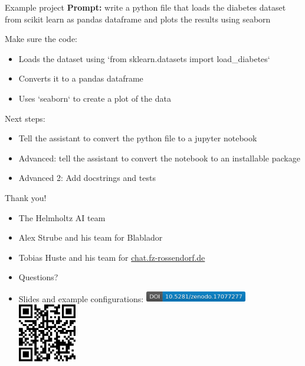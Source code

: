 \documentclass[
  aspectratio=1610,
]{beamer}
\begin{document}
\begin{frame}{Example project}
  \textbf{Prompt:} write a python file that loads the diabetes dataset from scikit learn as pandas dataframe and plots the results using seaborn

  Make sure the code:
  \begin{itemize}
    \item Loads the dataset using `from sklearn.datasets import load\_diabetes`
    \item Converts it to a pandas dataframe
    \item Uses `seaborn` to create a plot of the data
  \end{itemize}
  Next steps:
  \begin{itemize}
    \item Tell the assistant to convert the python file to a jupyter notebook
    \item Advanced: tell the assistant to convert the notebook to an installable package
    \item Advanced 2: Add docstrings and tests
  \end{itemize}
\end{frame}


\begin{frame}{Thank you!}
  \begin{itemize}
    \item The Helmholtz AI team
    \item Alex Strube and his team for Blablador
    \item Tobias Huste and his team for \href{https://chat.fz-rossendorf.de}{chat.fz-rossendorf.de}
    \item Questions?
    \item Slides and example configurations:  \href{https://doi.org/10.5281/zenodo.17077276}{\includegraphics[width=0.35\textwidth]{images/zenodo.png}}\\ \href{https://doi.org/10.5281/zenodo.17077276}{\includegraphics[width=0.2\textwidth]{images/barcode.eps}}
  \end{itemize}

\end{frame}
\end{document}
